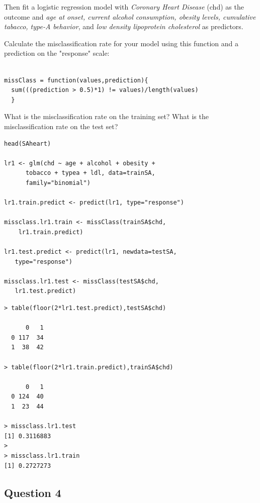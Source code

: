 \documentclass[caret-main.tex]{subfiles}
\begin{document}
\noindent Then fit a logistic regression model with \textit{Coronary Heart Disease} (chd) as the
outcome and \textit{age at onset, current alcohol consumption, obesity levels,
cumulative tabacco, type-A behavior}, and \textit{low density lipoprotein cholesterol} as predictors. 



\noindent Calculate the misclassification rate for your model using this
function and a prediction on the "response" scale:
\begin{framed}
\begin{verbatim}

missClass = function(values,prediction){
  sum(((prediction > 0.5)*1) != values)/length(values)
  }
\end{verbatim}
\end{framed}
\noindent What is the misclassification rate on the training set? What is the
misclassification rate on the test set?
\begin{framed}
\begin{verbatim}
head(SAheart)

lr1 <- glm(chd ~ age + alcohol + obesity + 
      tobacco + typea + ldl, data=trainSA, 
      family="binomial")

lr1.train.predict <- predict(lr1, type="response")

missclass.lr1.train <- missClass(trainSA$chd, 
    lr1.train.predict)

lr1.test.predict <- predict(lr1, newdata=testSA, 
   type="response")
   
missclass.lr1.test <- missClass(testSA$chd, 
   lr1.test.predict)
\end{verbatim}
\end{framed}


\begin{verbatim}
> table(floor(2*lr1.test.predict),testSA$chd)
   
      0   1
  0 117  34
  1  38  42

> table(floor(2*lr1.train.predict),trainSA$chd)
   
      0   1
  0 124  40
  1  23  44

> missclass.lr1.test
[1] 0.3116883
> 
> missclass.lr1.train
[1] 0.2727273
\end{verbatim}
\newpage
\subsection*{Question 4}
\end{document}
